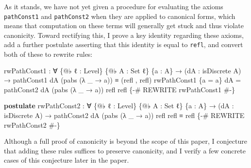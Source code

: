 \documentclass[
  12pt]{article}
\newenvironment{Shaded}{\begin{snugshade}}{\end{snugshade}}
\newcommand{\DataTypeTok}[1]{\textcolor[rgb]{0.00,0.34,0.68}{#1}}
\newcommand{\KeywordTok}[1]{\textcolor[rgb]{0.12,0.11,0.11}{\textbf{#1}}}
\newcommand{\NormalTok}[1]{\textcolor[rgb]{0.12,0.11,0.11}{#1}}
\newcommand{\OtherTok}[1]{\textcolor[rgb]{0.00,0.43,0.16}{#1}}
\newcommand{\PreprocessorTok}[1]{\textcolor[rgb]{0.00,0.43,0.16}{#1}}
\begin{document}
As it stands, we have not yet given a procedure for evaluating the
axioms \texttt{pathConst1} and \texttt{pathConst2} when they are applied
to canonical forms, which means that computation on these terms will
generally get stuck and thus violate canonicity. Toward rectifying this,
I prove a key identity regarding these axioms, add a further postulate
asserting that this identity is equal to \texttt{refl}, and convert both
of these to rewrite rules:

\begin{Shaded}
\begin{Highlighting}[]
\NormalTok{rwPathConst1 }\OtherTok{:} \OtherTok{∀} \OtherTok{\{@}\NormalTok{♭ ℓ }\OtherTok{:}\NormalTok{ Level}\OtherTok{\}} \OtherTok{\{@}\NormalTok{♭ A }\OtherTok{:} \DataTypeTok{Set}\NormalTok{ ℓ}\OtherTok{\}} \OtherTok{\{}\NormalTok{a }\OtherTok{:}\NormalTok{ A}\OtherTok{\}} \OtherTok{→} \OtherTok{(}\NormalTok{dA }\OtherTok{:}\NormalTok{ isDiscrete A}\OtherTok{)} 
               \OtherTok{→}\NormalTok{ pathConst1 dA }\OtherTok{(}\NormalTok{pabs }\OtherTok{(λ} \OtherTok{\_} \OtherTok{→}\NormalTok{ a}\OtherTok{))}\NormalTok{ ≡ }\OtherTok{(}\NormalTok{refl , refl}\OtherTok{)}
\NormalTok{rwPathConst1 }\OtherTok{\{}\NormalTok{a }\OtherTok{=}\NormalTok{ a}\OtherTok{\}}\NormalTok{ dA }\OtherTok{=}\NormalTok{ pathConst2 dA }\OtherTok{(}\NormalTok{pabs }\OtherTok{(λ} \OtherTok{\_} \OtherTok{→}\NormalTok{ a}\OtherTok{))}\NormalTok{ refl refl}
\PreprocessorTok{\{{-}\# REWRITE rwPathConst1 \#{-}\}}

\KeywordTok{postulate}
\NormalTok{    rwPathConst2 }\OtherTok{:} \OtherTok{∀} \OtherTok{\{@}\NormalTok{♭ ℓ }\OtherTok{:}\NormalTok{ Level}\OtherTok{\}} \OtherTok{\{@}\NormalTok{♭ A }\OtherTok{:} \DataTypeTok{Set}\NormalTok{ ℓ}\OtherTok{\}} \OtherTok{\{}\NormalTok{a }\OtherTok{:}\NormalTok{ A}\OtherTok{\}} \OtherTok{→} \OtherTok{(}\NormalTok{dA }\OtherTok{:}\NormalTok{ isDiscrete A}\OtherTok{)}
                   \OtherTok{→}\NormalTok{ pathConst2 dA }\OtherTok{(}\NormalTok{pabs }\OtherTok{(λ} \OtherTok{\_} \OtherTok{→}\NormalTok{ a}\OtherTok{))}\NormalTok{ refl refl ≡ refl}
    \PreprocessorTok{\{{-}\# REWRITE rwPathConst2 \#{-}\}}
\end{Highlighting}
\end{Shaded}

Although a full proof of canonicity is beyond the scope of this paper, I
conjecture that adding these rules suffices to preserve canonicity, and
I verify a few concrete cases of this conjecture later in the paper.
\end{document}
